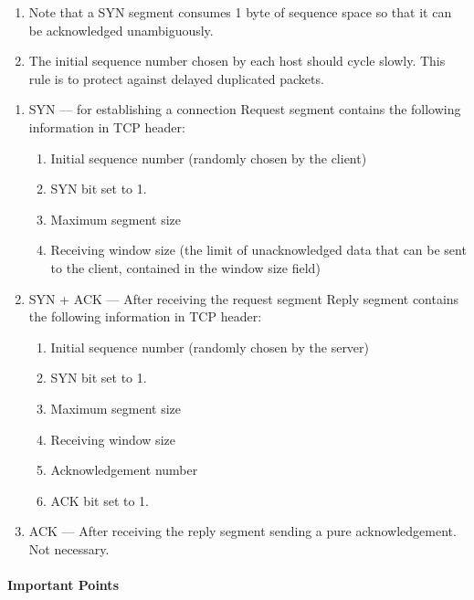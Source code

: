 \begin{enumerate}
    \item Note that a SYN segment
    consumes 1 byte of sequence
    space so that it can be
    acknowledged unambiguously.
    \item The initial sequence number
    chosen by each host should
    cycle slowly. This rule is to
    protect against delayed
    duplicated packets.    
\end{enumerate}

\begin{enumerate}
    \item SYN --- for establishing a connection
    \subitem Request segment contains the following information in TCP header:
    \begin{enumerate}\scriptsize
        \item Initial sequence number (randomly chosen by the client)
        \item SYN bit set to 1.
        \item Maximum segment size
        \item Receiving window size (the limit of unacknowledged data that can be sent to the client, contained in the window size field)       
    \end{enumerate}
    \item SYN + ACK --- After receiving the request segment
    \subitem Reply segment contains the following information in TCP header:
    \begin{enumerate}\scriptsize
        \item Initial sequence number (randomly chosen by the server)
        \item SYN bit set to 1.
        \item Maximum segment size
        \item Receiving window size
        \item Acknowledgement number
        \item ACK bit set to 1. 
    \end{enumerate}
    \item ACK --- After receiving the reply segment
    \subitem sending a pure acknowledgement. Not necessary. 
\end{enumerate}

\paragraph{Important Points}\quad

